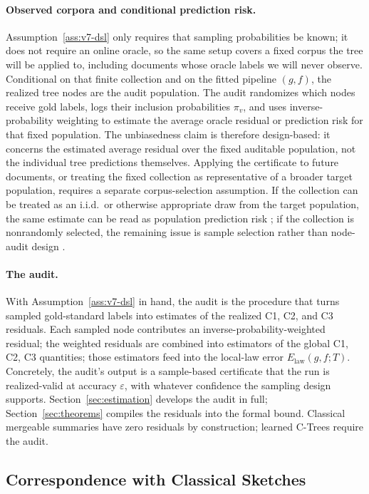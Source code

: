 \paragraph{Observed corpora and conditional prediction risk.}
Assumption~\ref{ass:v7-dsl} only requires that sampling probabilities
be known; it does not require an online oracle, so the same setup
covers a fixed corpus the tree will be applied to, including
documents whose oracle labels we will never observe. Conditional on that finite collection and on the fitted
pipeline \((g,f)\), the realized tree nodes are the audit population.
The audit randomizes which nodes receive gold labels, logs their
inclusion probabilities \(\pi_v\), and uses inverse-probability
weighting to estimate the average oracle residual or prediction risk
for that fixed population. The unbiasedness claim is therefore
design-based: it concerns the estimated average residual over the
fixed auditable population, not the individual tree predictions
themselves. Applying the certificate to future documents, or treating
the fixed collection as representative of a broader target population,
requires a separate corpus-selection assumption. If the collection can
be treated as an i.i.d.\ or otherwise appropriate draw from the target
population, the same estimate can be read as population prediction
risk \citep{Wooldridge2010}; if the collection is nonrandomly selected,
the remaining issue is sample selection rather than node-audit design
\citep{Heckman1979,Manski1989Selection}.

\paragraph{The audit.}
With Assumption~\ref{ass:v7-dsl} in hand, the audit is the procedure
that turns sampled gold-standard labels into estimates of the realized
C1, C2, and C3 residuals. Each sampled node contributes an
inverse-probability-weighted residual; the weighted residuals are
combined into estimators of the global C1, C2, C3 quantities; those
estimators feed into the local-law error \(E_{\mathrm{law}}(g,f;T)\).
Concretely, the audit's output is a sample-based certificate that the
run is realized-valid at accuracy \(\varepsilon\), with whatever
confidence the sampling design supports.
Section~\ref{sec:estimation} develops the audit in full;
Section~\ref{sec:theorems} compiles the residuals into the formal
bound. Classical mergeable summaries have zero residuals by
construction; learned C-Trees require the audit.

\subsection{Correspondence with Classical Sketches}
\label{sec:v7-ctreepo-correspondence}

